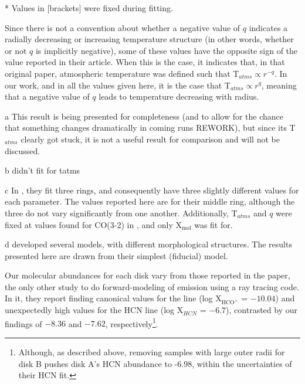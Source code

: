 \begin{table}[ht!]
\begin{threeparttable}
\begin{tabular}{l l l c c c }
      \bottomrule
    \end{tabular}
    \begin{tablenotes}\footnotesize
      \item[*] Values in [brackets] were fixed during fitting.
      \item[\dagger] Since there is not a convention about whether a negative value of $q$ indicates a radially decreasing or increasing temperature structure (in other words, whether or not $q$ is implicitly negative), some of these values have the opposite sign of the value reported in their article. When this is the case, it indicates that, in that original paper, atmospheric temperature was defined such that T$_{atms} \propto r^{-q}$. In our work, and in all the values given here, it is the case that T$_{atms} \propto r^{q}$, meaning that a negative value of $q$ leads to temperature decreasing with radius.
      \item[a] This result is being presented for completeness (and to allow for the chance that something changes dramatically in coming runs REWORK), but since its T$_{atms}$ clearly got stuck, it is not a useful result for comparison and will not be discussed.
      \item[b] \cite{Rosenfeld2012} didn't fit for tatms
      \item[c] In \citet{Flaherty2017}, they fit three rings, and consequently have three slightly different values for each parameter. The values reported here are for their middle ring, although the three do not vary significantly from one another. Additionally, T$_{atms}$ and $q$ were fixed at values found for CO(3-2) in \citet{Flaherty2015}, and only X$_\text{mol}$ was fit for.
      \item[d] \citet{Flaherty2018} developed several models, with different morphological structures. The results presented here are drawn from their simplest (fiducial) model.
    \end{tablenotes}
  \end{threeparttable}
\end{table}




Our molecular abundances for each disk vary from those reported in the \citet{Factor2017} paper, the only other study to do forward-modeling of \hco emission using a ray tracing code. In it, they report finding canonical values for the \hco line (log X$_{\text{HCO}^+}$ = $-10.04$) and unexpectedly high values for the HCN line (log X$_{HCN}$ = $-6.7$), contrasted by our findings of $-8.36$ and $-7.62$, respectively\footnote{Although, as described above, removing samples with large outer radii for disk B pushes disk A's HCN abundance to -6.98, within the uncertainties of their HCN fit.}.


